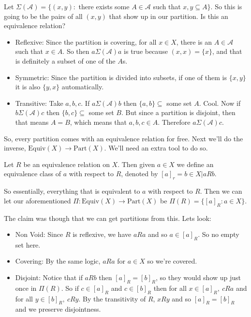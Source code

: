 Let \(\Sigma(\mathcal{A}) = \{(x,y): \) there exists some \(A \in \mathcal{A}\) such that \({x, y} \subseteq A\}\). So this is going to be the pairs of all \((x,y)\) that show up in our partition. Is this an equivalence relation?

\begin{itemize}
    \item Reflexive: Since the partition is covering, for all \(x \in X\), there is an \(A \in \mathcal{A}\) such that \(x \in A\). So then \(a\Sigma(\mathcal{A})a\) is true because \((x,x) = \{x\}\), and that is definitely a subset of one of the \(A\)s.
    \item Symmetric: Since the partition is divided into subsets, if one of them is \(\{x,y\}\) it is also \(\{y,x\}\) automatically.
    \item Transitive: Take \(a, b, c\). If \(a\Sigma(\mathcal{A})b\) then \(\{a, b\} \subseteq\) some set \(A\). Cool. Now if \(b\Sigma(\mathcal{A})c\) then \(\{b,c\} \subseteq \) some set \(B\). But since a partition is disjoint, then that means \(A = B\), which means that \(a, b, c \in A\). Therefore \(a\Sigma(\mathcal{A})c\).
\end{itemize}

So, every partition comes with an equivalence relation for free. Next we'll do the inverse, \(\text{Equiv}(X) \rightarrow \text{Part}(X)\). We'll need an extra tool to do so.

 Let \(R\) be an equivalence relation on \(X\). Then given \(a \in X\) we define an equivalence class of \(a\) with respect to \(R\), denoted by \([a]_r = {b \in X | aRb}\).

So essentially, everything that is equivalent to \(a\) with respect to \(R\). Then we can let our aforementioned \(\Pi: \text{Equiv}(X) \rightarrow \text{Part}(X)\) be \(\Pi(R) = \{[a]_R: a \in X\}\).

The claim was though that we can get partitions from this. Lets look:
\begin{itemize}
    \item Non Void: Since \(R\) is reflexive, we have \(aRa\) and so \(a \in [a]_R\). So no empty set here.
    \item Covering: By the same logic, \(aRa\) for \(a \in X\) so we're covered.
    \item Disjoint: Notice that if \(aRb\) then \([a]_R = [b]_R\), so they would show up just once in \(\Pi(R)\). So if \(c \in [a]_R\) and \(c \in [b]_R\) then for all \(x \in [a]_R,\ cRa\) and for all \(y \in [b]_R,\ cRy\). By the transitivity of \(R\), \(xRy\) and so \([a]_R = [b]_R\) and we preserve disjointness.
\end{itemize}

